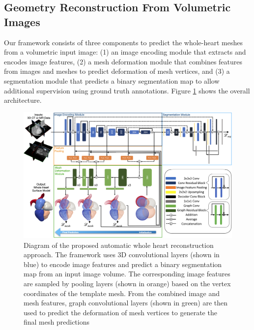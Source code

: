 \documentclass[times,review,preprint,authoryear]{elsarticle}
\begin{document}
\subsection{Geometry Reconstruction From Volumetric Images}
Our framework consists of three components to predict the whole-heart meshes from a volumetric input image: (1) an image encoding module that extracts and encodes image features, (2) a mesh deformation module that combines features from images and meshes to predict deformation of mesh vertices, and (3) a segmentation module that predicts a binary segmentation map to allow additional supervision using ground truth annotations. Figure \ref{figure:network} shows the overall architecture.
\begin{figure}[h]
\centering
\includegraphics[width=\textwidth]{network3.png}
\caption{Diagram of the proposed automatic whole heart reconstruction approach. The framework uses 3D convolutional layers (shown in blue) to encode image features and predict a binary segmentation map from an input image volume. The corresponding image features are sampled by pooling layers (shown in orange) based on the vertex coordinates of the template mesh. From the combined image and mesh features, graph convolutional layers (shown in green) are then used to predict the deformation of mesh vertices to generate the final mesh predictions} 
\label{figure:network}
\end{figure}
\end{document}

